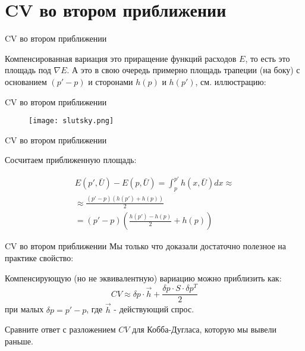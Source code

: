 \documentclass{beamer}
\begin{document}
\section{CV во втором приближении}

\begin{frame}{CV во втором приближении}

Компенсированная вариация это приращение функций расходов $E$, то есть это площадь под $\nabla E$. А это в свою очередь примерно площадь трапеции (на боку) с основанием $(p'-p)$ и сторонами $h(p)$ и $h(p')$, см. иллюстрацию:

\end{frame}

\begin{frame}{CV во втором приближении}

\begin{figure}[hbt]
\centering
\texttt{[image: slutsky.png]}
\end{figure}

\end{frame}

\begin{frame}{CV во втором приближении}

Сосчитаем приближенную площадь:

\begin{gather*}
E(p', \bar U) - E(p, \bar U) = \int_p^{p'} h(x, \bar U) dx \approx\\
\approx \frac{(p'-p)(h(p')+h(p))}{2}\\
 = (p'-p)(\frac{h(p') - h(p)}{2} + h(p))
\end{gather*}

\end{frame}

\begin{frame}{CV во втором приближении}
Мы только что доказали достаточно полезное на практике свойство:

\begin{lemma}
Компенсирующую (но не эквивалентную) вариацию можно приблизить как:
$$CV \approx \delta p \cdot \vec h + \frac{\delta p \cdot S \cdot \delta p^T}{2}$$
при малых $\delta p = p' - p$, где $\vec h$ - действующий спрос.
\end{lemma}

Сравните ответ с разложением $CV$ для Кобба-Дугласа, которую мы вывели раньше.

\end{frame}
\end{document}
